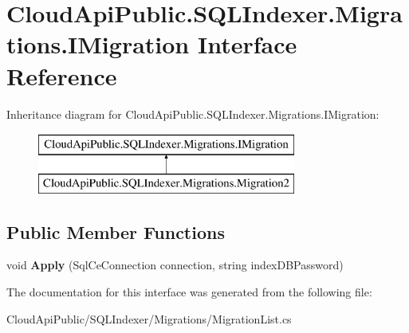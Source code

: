 \hypertarget{interface_cloud_api_public_1_1_s_q_l_indexer_1_1_migrations_1_1_i_migration}{\section{Cloud\-Api\-Public.\-S\-Q\-L\-Indexer.\-Migrations.\-I\-Migration Interface Reference}
\label{interface_cloud_api_public_1_1_s_q_l_indexer_1_1_migrations_1_1_i_migration}
}
Inheritance diagram for Cloud\-Api\-Public.\-S\-Q\-L\-Indexer.\-Migrations.\-I\-Migration\-:\begin{figure}[H]
\begin{center}
\leavevmode
\includegraphics[height=2.000000cm]{interface_cloud_api_public_1_1_s_q_l_indexer_1_1_migrations_1_1_i_migration}
\end{center}
\end{figure}
\subsection*{Public Member Functions}
\begin{DoxyCompactItemize}
\item 
\hypertarget{interface_cloud_api_public_1_1_s_q_l_indexer_1_1_migrations_1_1_i_migration_a4e37531f5ef5b73da646c1442cb77015}{void {\bfseries Apply} (Sql\-Ce\-Connection connection, string index\-D\-B\-Password)}\label{interface_cloud_api_public_1_1_s_q_l_indexer_1_1_migrations_1_1_i_migration_a4e37531f5ef5b73da646c1442cb77015}

\end{DoxyCompactItemize}


The documentation for this interface was generated from the following file\-:\begin{DoxyCompactItemize}
\item 
Cloud\-Api\-Public/\-S\-Q\-L\-Indexer/\-Migrations/Migration\-List.\-cs\end{DoxyCompactItemize}
